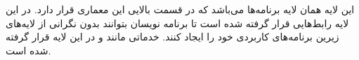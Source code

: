 \SubProblem
{}
{
این لایه همان لایه برنامه‌ها می‌باشد که در قسمت بالایی این معماری قرار دارد.
در این لایه رابط‌هایی قرار گرفته شده است تا برنامه نویسان بتوانند بدون نگرانی از لایه‌های زیرین برنامه‌های کاربردی خود را ایجاد کنند.
خدماتی مانند
و
در این لایه قرار گرفته شده است.
}
